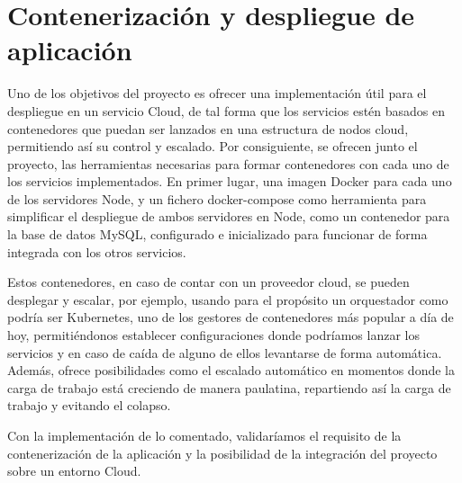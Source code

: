 \section{Contenerización y despliegue de aplicación}

Uno de los objetivos del proyecto es ofrecer una implementación útil para
el despliegue en un servicio Cloud, de tal forma que los servicios estén
basados en contenedores que puedan ser lanzados en una estructura de nodos
cloud, permitiendo así su control y escalado. Por consiguiente, se ofrecen
junto el proyecto, las herramientas necesarias para formar contenedores con
cada uno de los servicios implementados. En primer lugar, una imagen Docker
para cada uno de los servidores Node, y un fichero docker-compose como
herramienta para simplificar el despliegue de ambos servidores en
Node, como un contenedor para la base de datos MySQL, configurado e
inicializado para funcionar de forma integrada con los otros servicios.

Estos contenedores, en caso de contar con un proveedor cloud, se pueden
desplegar y escalar, por ejemplo, usando para el propósito un orquestador
como podría ser Kubernetes, uno de los gestores de contenedores más popular
a día de hoy, permitiéndonos establecer configuraciones donde podríamos
lanzar los servicios y en caso de caída de alguno de ellos levantarse de
forma automática. Además, ofrece posibilidades como el escalado automático
en momentos donde la carga de trabajo está creciendo de manera paulatina,
repartiendo así la carga de trabajo y evitando el colapso.

Con la implementación de lo comentado, validaríamos el requisito de la
contenerización de la aplicación y la posibilidad de la integración del
proyecto sobre un entorno Cloud.




